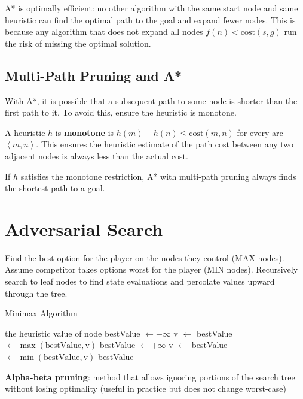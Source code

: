 \documentclass[11pt]{article}
\begin{document}
A* is optimally efficient: no other algorithm with the same start node and same heuristic can find the
optimal path to the goal and expand fewer nodes.
This is because any algorithm that does not expand all nodes \(f(n) < \text{cost}(s,g)\) run the risk
of missing the optimal solution.
\subsection{Multi-Path Pruning and A*}
\label{sec:org4747b37}
With A*, it is possible that a subsequent path to some node is shorter than the first path to it.
To avoid this, ensure the heuristic is monotone.

A heuristic \(h\) is \textbf{monotone} is \(h(m) - h(n) \le \text{cost} (m, n)\) for every arc
\(\left< m, n \right>\).
This ensures the heuristic estimate of the path cost between any two adjacent nodes
is always less than the actual cost.

If \(h\) satisfies the monotone restriction, A* with multi-path pruning always finds the shortest path
to a goal.
\section{Adversarial Search}
\label{sec:org3bb81a7}
Find the best option for the player on the nodes they control (MAX nodes).
Assume competitor takes options worst for the player (MIN nodes).
Recursively search to leaf nodes to find state evaluations and percolate values upward through the
tree.

\begin{algorithm}
\caption{Minimax Algorithm}
\begin{algorithmic}[1]
        \State \Return the heuristic value of node
    \EndIf
        \State bestValue $\gets -\infty$
            \State v $\gets$ 
            \State bestValue $\gets \max(\text{bestValue}, \text{v})$
        \EndFor
    \Else
        \State bestValue $\gets +\infty$
            \State v $\gets$ 
            \State bestValue $\gets \min(\text{bestValue}, \text{v})$
        \EndFor
    \EndIf
    \State \Return bestValue
\EndFunction
\end{algorithmic}
\end{algorithm}

\textbf{Alpha-beta pruning}: method that allows ignoring portions of the search tree without losing optimality
(useful in practice but does not change worst-case)
\end{document}
